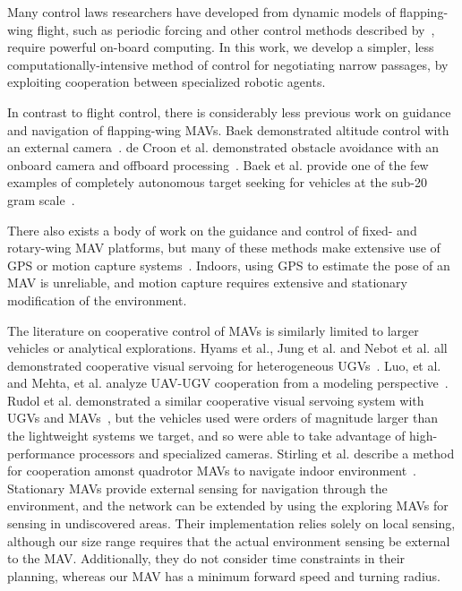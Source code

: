 \documentclass{aamas2013}
\begin{document}
Many control laws researchers have developed from dynamic models of 
flapping-wing flight, such as periodic forcing and other control methods 
described by~\cite{doman:dynamics}\cite{khan:longitudinal_control}\cite{leonard:averaging}, 
require powerful on-board computing. In this work, we develop a simpler, 
less computationally-intensive method of control for negotiating narrow 
passages, by exploiting cooperation between specialized robotic agents.

In contrast to flight control, there is considerably less previous work on 
guidance and navigation of flapping-wing MAVs. Baek demonstrated altitude 
control with an external camera~\cite{baek:altitude}. de Croon et al. 
demonstrated obstacle avoidance with an onboard camera and offboard 
processing~\cite{delfly:avoid}. Baek et al. provide one of the few examples 
of completely autonomous target seeking for vehicles at the sub-20 gram 
scale~\cite{baek:tracking}.

There also exists a body of work on the guidance and control of fixed- and 
rotary-wing MAV platforms, but many of these methods make extensive use of 
GPS or motion capture systems~\cite{kanade:3dvision}\cite{kingston:timeattitude}. 
Indoors, using GPS to estimate the pose of an MAV is unreliable, and motion 
capture requires extensive and stationary modification of the environment. 

The literature on cooperative control of MAVs is similarly limited to larger
vehicles or analytical explorations. Hyams et al., Jung et al. and Nebot et
al. all demonstrated cooperative visual servoing for heterogeneous
UGVs~\cite{Hyams1999Cooperative}\cite{Jung1998Range}\cite{Nebot2003Agents}.
Luo, et al. and Mehta, et al. analyze UAV-UGV cooperation from a modeling
perspective~\cite{Luo2011Air}\cite{Mehta2006Adaptive}. Rudol et al.
demonstrated a similar cooperative visual servoing system with UGVs and
MAVs~\cite{Rudol2008Micro}, but the vehicles used were orders of magnitude
larger than the lightweight systems we target, and so were able to take
advantage of high-performance processors and specialized cameras. Stirling et
al. describe a method for cooperation amonst quadrotor MAVs to navigate indoor
environment~\cite{SwarmStirling}. Stationary MAVs provide external sensing for
navigation through the environment, and the network can be extended by using
the exploring MAVs for sensing in undiscovered areas. Their implementation
relies solely on local sensing, although our size range requires that the
actual environment sensing be external to the MAV. Additionally, they do not
consider time constraints in their planning, whereas our MAV has a minimum
forward speed and turning radius.
\end{document}
